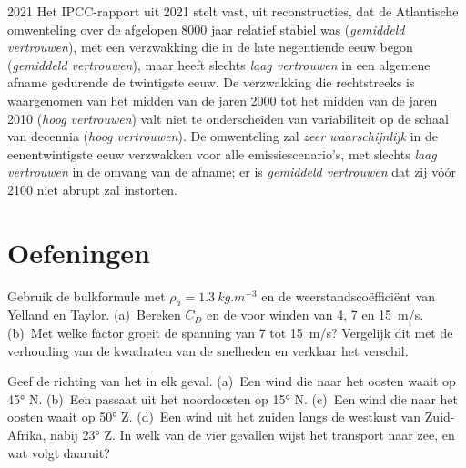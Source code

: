 \begin{dated}{2021}
Het IPCC-rapport uit 2021 stelt vast, uit reconstructies, dat de Atlantische omwenteling over de afgelopen \num{8000} jaar relatief stabiel was (\emph{gemiddeld vertrouwen}), met een verzwakking die in de late negentiende eeuw begon (\emph{gemiddeld vertrouwen}), maar heeft slechts \emph{laag vertrouwen} in een algemene afname gedurende de twintigste eeuw. De verzwakking die rechtstreeks is waargenomen van het midden van de jaren 2000 tot het midden van de jaren 2010 (\emph{hoog vertrouwen}) valt niet te onderscheiden van variabiliteit op de schaal van decennia (\emph{hoog vertrouwen}). De omwenteling zal \emph{zeer waarschijnlijk} in de eenentwintigste eeuw verzwakken voor alle emissiescenario's, met slechts \emph{laag vertrouwen} in de omvang van de afname; er is \emph{gemiddeld vertrouwen} dat zij vóór 2100 niet abrupt zal instorten.
\end{dated}

\section{Oefeningen}

\begin{exercise}[$\star$]\label{exo:b1:ocean-circulation:1}
Gebruik de bulkformule met $\rho_a = \qty{1.3}{kg.m^{-3}}$ en de weerstandscoëfficiënt
van Yelland en Taylor. (a)~Bereken $C_D$ en de  voor winden van 4, 7 en
\qty{15}{m/s}. (b)~Met welke factor groeit de spanning van 7 tot \qty{15}{m/s}?
Vergelijk dit met de verhouding van de kwadraten van de snelheden en verklaar het verschil.
\end{exercise}

\begin{exercise}[$\star$]\label{exo:b1:ocean-circulation:2}
Geef de richting van het  in elk geval. (a)~Een wind die naar het oosten waait op \ang{45} N.
(b)~Een passaat uit het noordoosten op \ang{15} N. (c)~Een wind die naar het oosten waait op \ang{50} Z. (d)~Een wind uit het zuiden langs de
westkust van Zuid-Afrika, nabij \ang{23} Z. In welk van de vier gevallen wijst het transport naar zee, en wat volgt daaruit?
\end{exercise}

